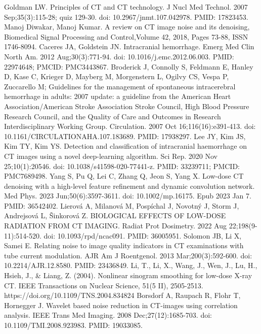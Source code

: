 \documentclass{article}
\begin{document}
\begin{thebibliography}{99}

Goldman LW. Principles of CT and CT technology. J Nucl Med Technol. 2007 Sep;35(3):115-28; quiz 129-30. doi: 10.2967/jnmt.107.042978. PMID: 17823453.
Manoj Diwakar, Manoj Kumar. A review on CT image noise and its denoising,
Biomedical Signal Processing and Control,Volume 42, 2018, Pages 73-88,
ISSN 1746-8094.
Caceres JA, Goldstein JN. Intracranial hemorrhage. Emerg Med Clin North Am. 2012 Aug;30(3):771-94. doi: 10.1016/j.emc.2012.06.003. PMID: 22974648; PMCID: PMC3443867.
Broderick J, Connolly S, Feldmann E, Hanley D, Kase C, Krieger D, Mayberg M, Morgenstern L, Ogilvy CS, Vespa P, Zuccarello M; Guidelines for the management of spontaneous intracerebral hemorrhage in adults: 2007 update: a guideline from the American Heart Association/American Stroke Association Stroke Council, High Blood Pressure Research Council, and the Quality of Care and Outcomes in Research Interdisciplinary Working Group. Circulation. 2007 Oct 16;116(16):e391-413. doi: 10.1161/CIRCULATIONAHA.107.183689. PMID: 17938297.
Lee JY, Kim JS, Kim TY, Kim YS. Detection and classification of intracranial haemorrhage on CT images using a novel deep-learning algorithm. Sci Rep. 2020 Nov 25;10(1):20546. doi: 10.1038/s41598-020-77441-z. PMID: 33239711; PMCID: PMC7689498.
Yang S, Pu Q, Lei C, Zhang Q, Jeon S, Yang X. Low-dose CT denoising with a high-level feature refinement and dynamic convolution network. Med Phys. 2023 Jun;50(6):3597-3611. doi: 10.1002/mp.16175. Epub 2023 Jan 7. PMID: 36542402.
Lierová A, Milanová M, Pospíchal J, Novotný J, Storm J, Andrejsová L, Šinkorová Z. BIOLOGICAL EFFECTS OF LOW-DOSE RADIATION FROM CT IMAGING. Radiat Prot Dosimetry. 2022 Aug 22;198(9-11):514-520. doi: 10.1093/rpd/ncac091. PMID: 36005951.
Solomon JB, Li X, Samei E. Relating noise to image quality indicators in CT examinations with tube current modulation. AJR Am J Roentgenol. 2013 Mar;200(3):592-600. doi: 10.2214/AJR.12.8580. PMID: 23436849.
Li, T., Li, X., Wang, J., Wen, J., Lu, H., Hsieh, J., & Liang, Z. (2004). Nonlinear sinogram smoothing for low-dose X-ray CT. IEEE Transactions on Nuclear Science, 51(5 II), 2505-2513. https://doi.org/10.1109/TNS.2004.834824
Borsdorf A, Raupach R, Flohr T, Hornegger J. Wavelet based noise reduction in CT-images using correlation analysis. IEEE Trans Med Imaging. 2008 Dec;27(12):1685-703. doi: 10.1109/TMI.2008.923983. PMID: 19033085.

\end{thebibliography}
\end{document}
